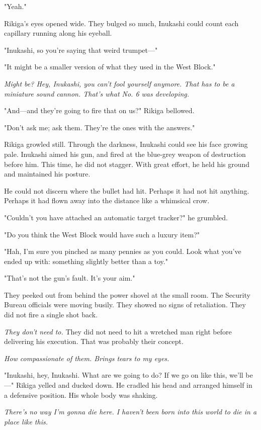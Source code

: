 "Yeah."

Rikiga's eyes opened wide. They bulged so much, Inukashi could count
each capillary running along his eyeball.

"Inukashi, so you're saying that weird trumpet---"

"It might be a smaller version of what they used in the West Block."

\emph{Might be? Hey, Inukashi, you can't fool yourself anymore. That has to be
a miniature sound cannon. That's what No. 6 was developing.}

"And---and they're going to fire that on us?" Rikiga bellowed.

"Don't ask me; ask them. They're the ones with the answers."

Rikiga growled still. Through the darkness, Inukashi could see his face
growing pale. Inukashi aimed his gun, and fired at the blue-grey weapon
of destruction before him. This time, he did not stagger. With great
effort, he held his ground and maintained his posture.

He could not discern where the bullet had hit. Perhaps it had not hit
anything. Perhaps it had flown away into the distance like a whimsical
crow.

"Couldn't you have attached an automatic target tracker?" he grumbled.

"Do you think the West Block would have such a luxury item?"

"Hah, I'm sure you pinched as many pennies as you could. Look what
you've ended up with: something slightly better than a toy."

"That's not the gun's fault. It's your aim."

They peeked out from behind the power shovel at the small room. The
Security Bureau officials were moving busily. They showed no signs of
retaliation. They did not fire a single shot back.

\emph{They don't need to.} They did not need to hit a wretched man right before
delivering his execution. That was probably their concept.

\emph{How compassionate of them. Brings tears to my eyes.}

"Inukashi, hey, Inukashi. What are we going to do? If we go on like
this, we'll be---" Rikiga yelled and ducked down. He cradled his head and
arranged himself in a defensive position. His whole body was shaking.

\emph{There's no way I'm gonna die here. I haven't been born into this world
to die in a place like this.}

